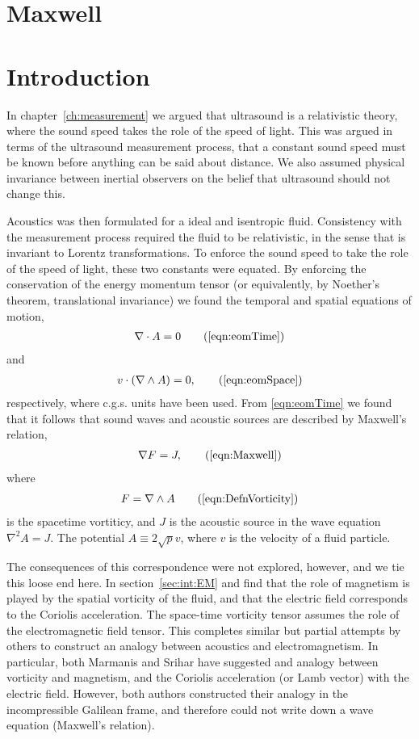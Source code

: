 \documentclass[10pt, fleqn,draft,showtrims,oldfontcommands]{article} %
\newcommand{\eqa}[1]{\begin{align}#1\end{align}}
\newcommand{\secref}[1]{section~\ref{sec:#1}}
\newcommand{\eqnref}[1]{\ref{eqn:#1}}
\newcommand{\lr}[1]{\left( #1 \right)}
\newcommand{\del}{\nabla}
\newcommand{\chapref}[1]{chapter~\ref{ch:#1}}
\begin{document}
\section{Maxwell}\label{sec:Maxwell}


\section{Introduction}

In \chapref{measurement} we argued that ultrasound is a relativistic theory,
where the sound speed takes the role of the speed of light.
This was argued in terms of the  ultrasound measurement process,
that a constant sound speed must be known before anything can be said about distance.
We also assumed  physical invariance between inertial observers
on the belief that ultrasound should not change this.

Acoustics was then formulated for  a ideal and isentropic fluid.
Consistency with the measurement process required the fluid to be relativistic, 
in the sense that is invariant to Lorentz transformations.
To enforce the sound speed to take the role of the speed of light, 
these two constants were equated.
By enforcing the conservation of the energy momentum tensor
(or equivalently, by Noether's theorem, translational invariance)
we found the temporal and spatial equations of motion,
\eqa{
  \del \cdot A  =0 \tag{\ref{eqn:eomTime}}
}
and
\begin{align}
v \cdot \lr{\del \wedge A} = 0, \tag{\ref{eqn:eomSpace}}
\end{align}
respectively,
where c.g.s. units have been  used.
%
%
From \eqnref{eomTime} we found that it follows that sound waves and acoustic sources are described by Maxwell's relation,
\eqa{
\del F = J, \tag{\ref{eqn:Maxwell}}
}
where 
\eqa{
  F = \del \wedge A\tag{\ref{eqn:DefnVorticity}}
} is the spacetime vortiticy,
and $J$ is the acoustic source in the wave equation $\del^2 A = J$.
The potential $A \equiv 2\sqrt p v$, where $v$ is the velocity of a fluid particle.

The consequences of this correspondence were not explored, however,
and we tie this loose end here.
In \secref{int:EM} and find that 
the role of magnetism is played by the spatial vorticity of the fluid,
and that the electric field corresponds to the Coriolis acceleration.
The space-time vorticity tensor assumes the role of the electromagnetic field tensor.
This completes similar but partial  attempts by others to construct an analogy between acoustics and electromagnetism.
In particular, both Marmanis\cite{Marmanis2000} and Srihar\cite{Sridhar1998}
have suggested and analogy between vorticity and magnetism, 
and the Coriolis acceleration (or Lamb vector) with the electric field.
However, both authors constructed their analogy in the incompressible Galilean frame, 
and therefore could not write down a wave equation (Maxwell's relation).
\end{document}
